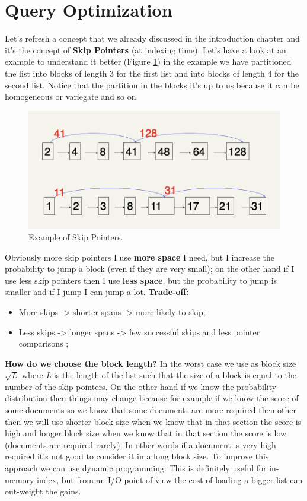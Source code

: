 \section{Query Optimization}
Let's refresh a concept that we already discussed in the introduction chapter and it's the concept of \textbf{Skip Pointers} (at indexing time). Let's have a look at an example to understand it better (Figure \ref{fig:skippointers}) in the example we have partitioned the list into blocks of length 3 for the first list and into blocks of length 4 for the second list. Notice that the partition in the blocks it's up to us because it can be homogeneous or variegate and so on.\newline
\begin{figure}
    \centering
    \includegraphics[width=0.75\linewidth]{images/skippointers.png}
    \caption{Example of Skip Pointers.}
    \label{fig:skippointers}
\end{figure}
Obviously more skip pointers I use \textbf{more space} I need, but I increase the probability to jump a block (even if they are very small); on the other hand if I use less skip pointers then I use \textbf{less space}, but the probability to jump is smaller and if I jump I can jump a lot.\newline
\textbf{Trade-off:}
\begin{itemize}
    \item More skips -> shorter spans -> more likely to skip;
    \item Less skips -> longer spans -> few successful skips and less pointer comparisons ;
\end{itemize}
\textbf{How do we choose the block length?} In the worst case we use as block size $\sqrt{L}$ where \textit{L} is the length of the list such that the size of a block is equal to the number of the skip pointers. On the other hand if we know the probability distribution then things may change because for example if we know the score of some documents so we know that some documents are more required then other then we will use shorter block size when we know that in that section the score is high and longer block size when we know that in that section the score is low (documents are required rarely). In other words if a document is very high required it's not good to consider it in a long block size. To improve this approach we can use dynamic programming.\newline
This is definitely useful for in-memory index, but from an I/O point of view the cost of loading a bigger list can out-weight the gains.

